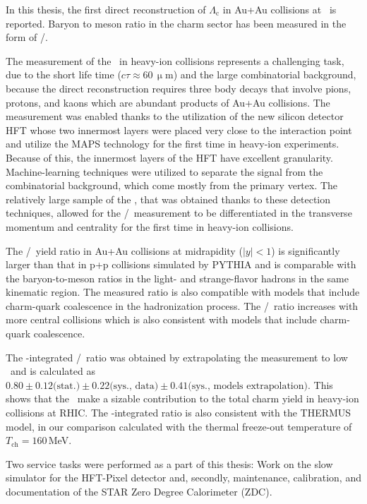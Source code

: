 In this thesis, the first direct reconstruction of $\Lambda_\mathrm{c}$ in Au+Au collisions at \snnFull\ is reported. Baryon to meson ratio in the charm sector has been measured in the form of \Lambdac/\dzero\@. 

The measurement of the \Lambdac\ in heavy-ion collisions represents a challenging task, due to the short life time ($c\tau \approx 60\,\upmu$m) and the large combinatorial background, because the direct reconstruction requires three body decays that involve pions, protons, and kaons which are abundant products of Au+Au collisions. The measurement was enabled thanks to the utilization of the new silicon detector HFT whose two innermost layers were placed very close to the interaction point and utilize the MAPS technology for the first time in heavy-ion experiments\@. Because of this, the innermost layers of the HFT have excellent granularity. Machine-learning techniques were utilized to separate the signal from the combinatorial background, which come mostly from the primary vertex. The relatively large sample of the \Lambdac, that was obtained thanks to these detection techniques, allowed for the \Lambdac/\dzero\ measurement to be differentiated in the transverse momentum and centrality for the first time in heavy-ion collisions.

The \Lambdac/\dzero\ yield ratio in Au+Au collisions at midrapidity ($|y| < 1$) is significantly larger than that in p+p collisions simulated by PYTHIA and is comparable with the baryon-to-meson ratios in the light- and strange-flavor hadrons in the same kinematic region. The measured ratio is also compatible with models that include charm-quark coalescence in the hadronization process.
The \Lambdac/\dzero\ ratio increases with more central collisions which is also consistent with models that include charm-quark coalescence.

The \pt-integrated \Lambdac/\dzero\ ratio was obtained by extrapolating the measurement to low \pt\ and is calculated as $0.80\pm0.12\text{(stat.)}\pm0.22\text{(sys., data)}\pm0.41\text{(sys., models extrapolation)}$\@. This shows that the \Lambdac\ make a sizable contribution to the total charm yield in heavy-ion collisions at RHIC. The \pt-integrated ratio is also consistent with the THERMUS model, in our comparison calculated with the thermal freeze-out temperature of $T_\mathrm{ch} = 160\,$MeV\@.


Two service tasks were performed as a part of this thesis: Work on the slow simulator for the HFT-Pixel detector and, secondly, maintenance, calibration, and documentation of the STAR Zero Degree Calorimeter (ZDC). 

